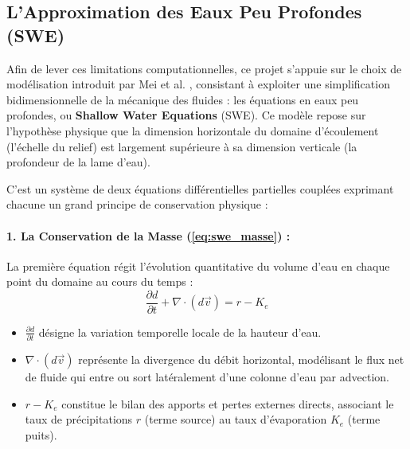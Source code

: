 \documentclass[10pt,twocolumn,a4paper]{article}
\begin{document}
\subsection{L'Approximation des Eaux Peu Profondes (SWE)}\label{subsec:swe}
Afin de lever ces limitations computationnelles, ce projet s'appuie sur le choix de modélisation introduit par Mei et al. \cite{MDH07}, consistant à exploiter une simplification bidimensionnelle de la mécanique des fluides : les équations en eaux peu profondes, ou \textbf{Shallow Water Equations} (SWE). Ce modèle repose sur l'hypothèse physique que la dimension horizontale du domaine d'écoulement (l'échelle du relief) est largement supérieure à sa dimension verticale (la profondeur de la lame d'eau).

C'est un système de deux équations différentielles partielles couplées exprimant chacune un grand principe de conservation physique :

\paragraph{1. La Conservation de la Masse (\ref{eq:swe_masse}) :}
La première équation régit l'évolution quantitative du volume d'eau en chaque point du domaine au cours du temps :
\begin{equation}\label{eq:swe_masse}
    \frac{\partial d}{\partial t} + \nabla \cdot (d \vec{v}) = r - K_e
\end{equation}
\begin{itemize}
    \item $\frac{\partial d}{\partial t}$ désigne la variation temporelle locale de la hauteur d'eau.
    \item $\nabla \cdot (d \vec{v})$ représente la divergence du débit horizontal, modélisant le flux net de fluide qui entre ou sort latéralement d'une colonne d'eau par advection.
    \item $r - K_e$ constitue le bilan des apports et pertes externes directs, associant le taux de précipitations $r$ (terme source) au taux d'évaporation $K_e$ (terme puits).
\end{itemize}
\end{document}
